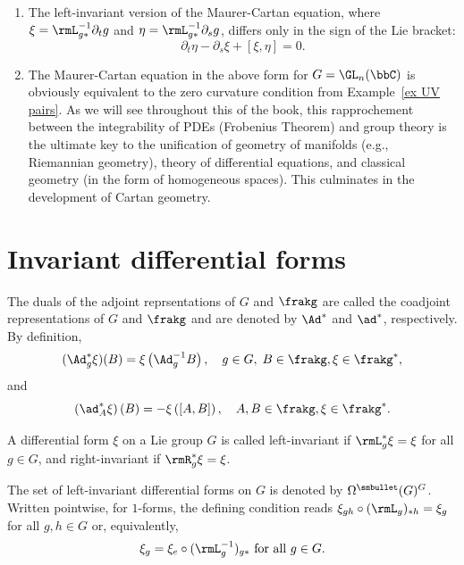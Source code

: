 \begin{rem}
    \begin{enumerate}
        \item The left-invariant version of the Maurer-Cartan equation, where $\xi=\rmL_{g\ast}^{-1}\partial_t g$ and $\eta =\rmL_{g\ast}^{-1}\partial_s g$, differs only in the sign of the Lie bracket: 
        \[\partial_t\eta-\partial_s\xi+[\xi,\eta]=0.\label{eq Maurer-Cartan left xi eta}\]
        \item The Maurer-Cartan equation in the above form for $G=\GL_n(\bbC)$ is obviously equivalent to the zero curvature condition from Example~\ref{ex UV pairs}. As we will see throughout this \partt{} of the book, this rapprochement between the integrability of PDEs (Frobenius Theorem) and group theory is the ultimate key to the unification of geometry of manifolds (e.g., Riemannian geometry), theory of differential equations, and classical geometry (in the form of homogeneous spaces). This culminates in the development of Cartan geometry.
    \end{enumerate}
\end{rem}










\section{Invariant differential forms}\label{subsec: invariant diff forms}

\begin{defn}
    The duals of the adjoint reprsentations of $G$ and $\frakg$ are called the coadjoint representations of $G$ and $\frakg$ and are denoted by $\Ad^\ast$ and $\ad^\ast$, respectively. By definition,
    \[(\Ad^\ast_g \xi)(B)=\xi\left(\Ad_g^{-1}B\right),\quad  g\in G,\;B\in\frakg,\xi\in\frakg^\ast,\]
    and 
    \[\left(\ad_A^\ast \xi\right)(B)=-\xi\left([A,B]\right),\quad A,B\in\frakg,\xi\in\frakg^\ast.\]
\end{defn}


\begin{defn}
    A differential form $\xi$ on a Lie group $G$ is called left-invariant if $\rmL_g^\ast\xi =\xi $ for all $g\in G$, and right-invariant if $\rmR_g^\ast\xi=\xi$.

    The set of left-invariant differential forms on $G$ is denoted by $\Omega^{\smbullet }(G)^G$. Written pointwise, for $1$-forms, the defining condition reads $\xi_{gh}\circ (\rmL_g)_{\ast h}=\xi_g$ for all $g,h\in G$ or, equivalently,
    \[\xi_g=\xi_e\circ (\rmL_{g}^{-1})_{g\ast}\text{ for all }g\in G.\label{eq 5.5.1 RS1}\]
\end{defn}

